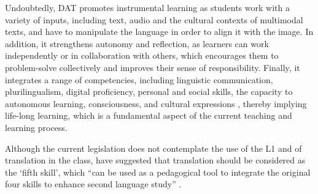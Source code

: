 Undoubtedly, DAT promotes instrumental learning as students work with a
variety of inputs, including text, audio and the cultural contexts of
multimodal texts, and have to manipulate the language in order to align
it with the image. In addition, it strengthens autonomy and reflection,
as learners can work independently or in collaboration with others,
which encourages them to problem-solve collectively and improves their
sense of responsibility. Finally, it integrates a range of competencies,
including linguistic communication, plurilingualism, digital
proficiency, personal and social skills, the capacity to autonomous
learning, consciousness, and cultural expressions \cite{Bobadilla-Pérez_CarballodeSantiago_2022,rodríguez-Arancón2023}, thereby implying
life-long learning, which is a fundamental aspect of the current
teaching and learning process.

Although the current legislation does not contemplate the use of the L1
and of translation in the class, \textcite{Carreres03072017,Colina03072017} have suggested that
translation should be considered as the `fifth skill', which ``can be
used as a pedagogical tool to integrate the original four skills to
enhance second language study'' \cite[p.~2]{Colina03072017}.
